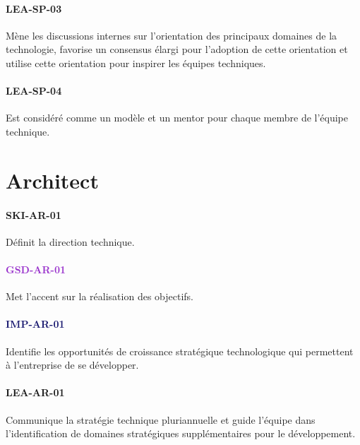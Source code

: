 \documentclass[a4paper, french, openany, 12pt]{book}
\newcommand\dex[1]{\textcolor{BrickRed}{\textbf{\uppercase{ski-{#1}}}}}
\newcommand\str[1]{\textcolor{DarkOrchid}{\textbf{\uppercase{gsd-{#1}}}}}
\newcommand\wis[1]{\textcolor{MidnightBlue}{\textbf{\uppercase{imp-{#1}}}}}
\newcommand\cha[1]{\textcolor{OliveGreen}{\textbf{\uppercase{lea-{#1}}}}}
\begin{document}
\begin{multicols}{2}
  \subsubsection*{\cha{sp-03}}

  Mène les discussions internes sur l'orientation des principaux domaines de la technologie, favorise un consensus élargi
  pour l'adoption de cette orientation et utilise cette orientation pour inspirer les équipes techniques.
  
  \subsubsection*{\cha{sp-04}}

  Est considéré comme un modèle et un mentor pour chaque membre de l'équipe technique.

\end{multicols}

\chapter{Architect}

\begin{multicols}{2}

  \subsubsection*{\dex{ar-01}}

  Définit la direction technique.

  \subsubsection*{\str{ar-01}}

  Met l'accent sur la réalisation des objectifs.

  \subsubsection*{\wis{ar-01}}

  Identifie les opportunités de croissance stratégique technologique qui permettent à l'entreprise de se développer.

  \subsubsection*{\cha{ar-01}}

  Communique la stratégie technique pluriannuelle et guide l'équipe dans l'identification de domaines stratégiques 
  supplémentaires pour le développement.

\end{multicols}
\end{document}
